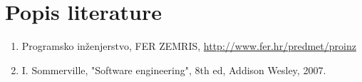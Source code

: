 \chapter*{Popis literature}
	 	
	
		
		
		\begin{enumerate}
			
			
			\item  Programsko inženjerstvo, FER ZEMRIS, \url{http://www.fer.hr/predmet/proinz}
			
			\item  I. Sommerville, "Software engineering", 8th ed, Addison Wesley, 2007.
			
			
			
			
		\end{enumerate}
		
		 